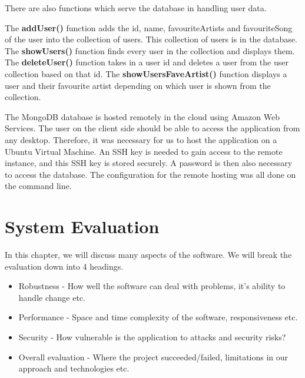 There are also functions which serve the database in handling user data.\newline

The \textbf{addUser()} function adds the id, name, favouriteArtists and favouriteSong of the user into the collection of users. This collection of users is in the database.\newline
The \textbf{showUsers()} function finds every user in the collection and displays them.\newline
The \textbf{deleteUser()} function takes in a user id and deletes a user from the user collection based on that id.\newline
The \textbf{showUsersFaveArtist()} function displays a user and their favourite artist depending on which user is shown from the collection.\newline

The MongoDB database is hosted remotely in the cloud using Amazon Web Services. The user on the client side should be able to access the application from any desktop. Therefore, it was necessary for us to host the application on a Ubuntu Virtual Machine. An SSH key is needed to gain access to the remote instance, and this SSH key is stored securely. A password is then also necessary to access the database. The configuration for the remote hosting was all done on the command line.\newline


\chapter{System Evaluation}
In this chapter, we will discuss many aspects of the software. We will break the evaluation down into 4 headings.
\begin{itemize}
  \item Robustness - How well the software can deal with problems, it's ability to handle change etc.
  \item Performance - Space and time complexity of the software, responsiveness etc.
  \item Security - How vulnerable is the application to attacks and security risks?
  \item Overall evaluation - Where the project succeeded/failed, limitations in our approach and technologies etc.
  \end{itemize}

